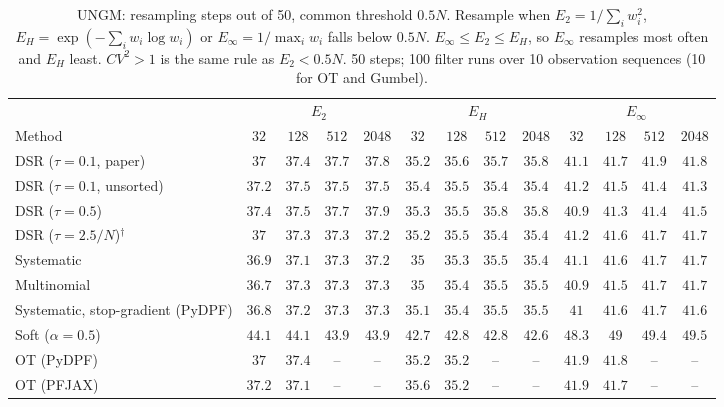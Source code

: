 \begin{table}[ht]
\centering
\small
\caption{UNGM: resampling steps out of 50, common threshold $0.5N$. Resample when $E_2=1/\sum_iw_i^2$, $E_H=\exp(-\sum_iw_i\log w_i)$ or $E_\infty=1/\max_iw_i$ falls below $0.5N$. $E_\infty\le E_2\le E_H$, so $E_\infty$ resamples most often and $E_H$ least. $CV^2>1$ is the same rule as $E_2<0.5N$. 50 steps; 100 filter runs over 10 observation sequences (10 for OT and Gumbel).}
\label{tab:trigger-fixed-ungm-resampling_steps}
\begin{adjustbox}{max width=\linewidth}
\begin{tabular}{lcccc|cccc|cccc}
\toprule
 & \multicolumn{4}{c}{$E_2$} & \multicolumn{4}{c}{$E_H$} & \multicolumn{4}{c}{$E_\infty$} \\
\cmidrule(lr){2-5} \cmidrule(lr){6-9} \cmidrule(lr){10-13}
Method & $32$ & $128$ & $512$ & $2048$ & $32$ & $128$ & $512$ & $2048$ & $32$ & $128$ & $512$ & $2048$ \\
\midrule
DSR ($\tau{=}0.1$, paper) & $37$ & $37.4$ & $37.7$ & $37.8$ & $35.2$ & $35.6$ & $35.7$ & $35.8$ & $41.1$ & $41.7$ & $41.9$ & $41.8$ \\
DSR ($\tau{=}0.1$, unsorted) & $37.2$ & $37.5$ & $37.5$ & $37.5$ & $35.4$ & $35.5$ & $35.4$ & $35.4$ & $41.2$ & $41.5$ & $41.4$ & $41.3$ \\
DSR ($\tau{=}0.5$) & $37.4$ & $37.5$ & $37.7$ & $37.9$ & $35.3$ & $35.5$ & $35.8$ & $35.8$ & $40.9$ & $41.3$ & $41.4$ & $41.5$ \\
DSR ($\tau{=}2.5/N$)$^\dagger$ & $37$ & $37.3$ & $37.3$ & $37.2$ & $35.2$ & $35.5$ & $35.4$ & $35.4$ & $41.2$ & $41.6$ & $41.7$ & $41.7$ \\
\midrule
Systematic & $36.9$ & $37.1$ & $37.3$ & $37.2$ & $35$ & $35.3$ & $35.5$ & $35.4$ & $41.1$ & $41.6$ & $41.7$ & $41.7$ \\
Multinomial & $36.7$ & $37.3$ & $37.3$ & $37.3$ & $35$ & $35.4$ & $35.5$ & $35.5$ & $40.9$ & $41.5$ & $41.7$ & $41.7$ \\
Systematic, stop-gradient (PyDPF) & $36.8$ & $37.2$ & $37.3$ & $37.3$ & $35.1$ & $35.4$ & $35.5$ & $35.5$ & $41$ & $41.6$ & $41.7$ & $41.6$ \\
Soft ($\alpha{=}0.5$) & $44.1$ & $44.1$ & $43.9$ & $43.9$ & $42.7$ & $42.8$ & $42.8$ & $42.6$ & $48.3$ & $49$ & $49.4$ & $49.5$ \\
OT (PyDPF) & $37$ & $37.4$ & -- & -- & $35.2$ & $35.2$ & -- & -- & $41.9$ & $41.8$ & -- & -- \\
OT (PFJAX) & $37.2$ & $37.1$ & -- & -- & $35.6$ & $35.2$ & -- & -- & $41.9$ & $41.7$ & -- & -- \\

\end{tabular}
\end{adjustbox}
\end{table}
